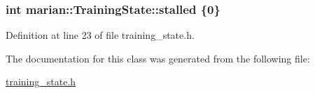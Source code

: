 \subsubsection[{\texorpdfstring{stalled}{stalled}}]{\setlength{\rightskip}{0pt plus 5cm}int marian\+::\+Training\+State\+::stalled \{0\}}\hypertarget{classmarian_1_1TrainingState_a8e007320f3eb4860aa19af20ce18c13d}{}\label{classmarian_1_1TrainingState_a8e007320f3eb4860aa19af20ce18c13d}


Definition at line 23 of file training\+\_\+state.\+h.



The documentation for this class was generated from the following file\+:\begin{DoxyCompactItemize}
\item 
\hyperlink{training__state_8h}{training\+\_\+state.\+h}\end{DoxyCompactItemize}
